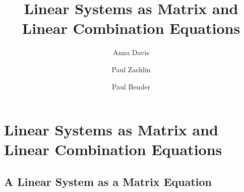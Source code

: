 \documentclass{ximera}
\author{Anna Davis \and Paul Zachlin \and Paul Bender} \title{Linear Systems as Matrix and Linear Combination Equations} \license{CC-BY 4.0}
\begin{document}
\begin{abstract}
\end{abstract}
\maketitle

\section*{Linear Systems as Matrix and Linear Combination Equations}

\subsection*{A Linear System as a Matrix Equation}
\end{document}
